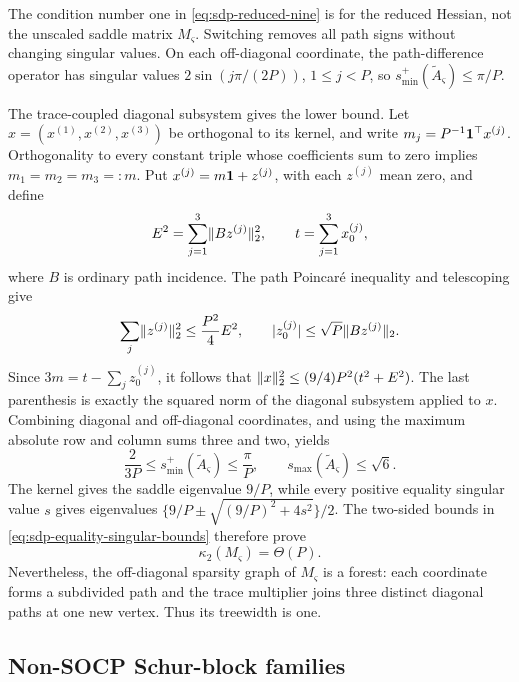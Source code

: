 The condition number one in \eqref{eq:sdp-reduced-nine} is for the reduced
Hessian, not the unscaled saddle matrix $M_\varsigma$.  Switching removes all
path signs without changing singular values.  On each off-diagonal
coordinate, the path-difference operator has singular values
$2\sin(j\pi/(2P))$, $1\leq j<P$, so $s_{\min}^+(\widetilde A_\varsigma)\leq\pi/P$.

The trace-coupled diagonal subsystem gives the lower bound.  Let
$x=(x^{(1)},x^{(2)},x^{(3)})$ be orthogonal to its kernel, and write $m_j=P^{-1}{\bf1}^\top x^{(j)}$.
Orthogonality to every constant triple whose
coefficients sum to zero implies $m_1=m_2=m_3=:m$.  Put
$x^{(j)}=m{\bf1}+z^{(j)}$, with each $z^{(j)}$ mean zero, and define
\begin{equation}
 E^2=\sum_{j=1}^3\lVert Bz^{(j)}\rVert_2^2,\qquad
 t=\sum_{j=1}^3x^{(j)}_0,
\end{equation}
where $B$ is ordinary path incidence.  The path Poincar\'e inequality and
telescoping give
\begin{equation}
 \sum_j\lVert z^{(j)}\rVert_2^2\leq\frac{P^2}{4}E^2,\qquad
 |z^{(j)}_0|\leq\sqrt P\lVert Bz^{(j)}\rVert_2.
\end{equation}
Since $3m=t-\sum_jz^{(j)}_0$, it follows that
$\lVert x\rVert_2^2\leq(9/4)P^2(t^2+E^2)$.  The last parenthesis is exactly the
squared norm of the diagonal subsystem applied to $x$.  Combining diagonal
and off-diagonal coordinates, and using the maximum absolute row and column
sums three and two, yields
\begin{equation}
 \frac{2}{3P}\leq s_{\min}^+(\widetilde A_\varsigma)
 \leq\frac\pi P,\qquad
 s_{\max}(\widetilde A_\varsigma)\leq\sqrt6.               \label{eq:sdp-equality-singular-bounds}
\end{equation}
The kernel gives the saddle eigenvalue $9/P$, while every positive equality
singular value $s$ gives eigenvalues
$\{9/P\pm\sqrt{(9/P)^2+4s^2}\}/2$.  The two-sided bounds in
\eqref{eq:sdp-equality-singular-bounds} therefore prove
\begin{equation}
 \kappa_2(M_\varsigma)=\Theta(P).                          \label{eq:sdp-saddle-kappa}
\end{equation}
Nevertheless, the off-diagonal sparsity graph of $M_\varsigma$ is a forest: each coordinate
forms a subdivided path and the trace multiplier joins three distinct
diagonal paths at one new vertex.  Thus its treewidth is one.

\subsection{Non-SOCP Schur-block families}
\label{sec:sdp-schur}


